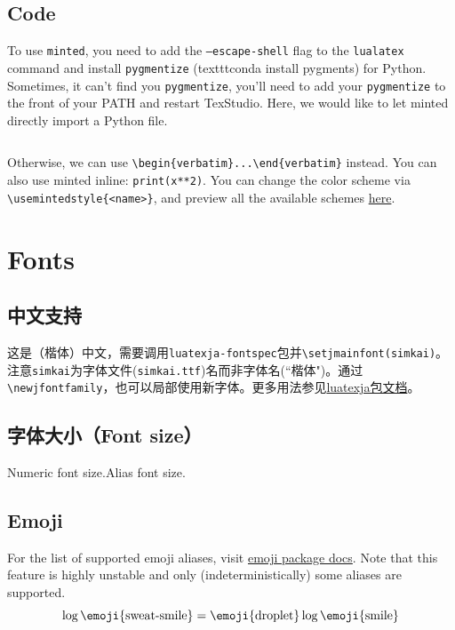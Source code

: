 \documentclass[a4paper]{article}
\begin{document}
\subsection{Code}

To use \texttt{minted}, you need to add the \texttt{--escape-shell} flag to the \texttt{lualatex} command and install \texttt{pygmentize} (texttt{conda install pygments}) for Python. Sometimes, it can't find you \texttt{pygmentize}, you'll need to add your \texttt{pygmentize} to the front of your PATH and restart TexStudio. Here, we would like to let minted directly import a Python file.
\inputminted[linenos]{python}{code/code1.py}
Otherwise, we can use \verb|\begin{verbatim}...\end{verbatim}| instead. You can also use minted inline: \texttt{print(x**2)}. You can change the color scheme via \verb|\usemintedstyle{<name>}|, and preview all the available schemes \href{https://pygments.org/styles/}{here}.

\section{Fonts}

\subsection{中文支持}

这是（楷体）中文，需要调用\verb|luatexja-fontspec|包并\verb|\setjmainfont(simkai)|。注意\verb|simkai|为字体文件(\verb|simkai.ttf|)名而非字体名(``楷体")。{\song 通过\verb|\newjfontfamily|，也可以局部使用新字体。}更多用法参见\href{https://ctan.math.utah.edu/ctan/tex-archive/macros/luatex/generic/luatexja/doc/luatexja-en.pdf}{luatexja包文档}。

\subsection{字体大小（Font size）}
{\fontsize{15pt}{15pt}\selectfont Numeric font size.}{\large Alias font size.}

\subsection{Emoji}
For the list of supported emoji aliases, visit \href{https://ctan.math.utah.edu/ctan/tex-archive/macros/luatex/latex/emoji/emoji-doc.pdf}{emoji package docs}. Note that this feature is highly unstable and only (indeterministically) some aliases are supported.
\begin{equation}
\log \text{\emoji{sweat-smile}} = \text{\emoji{droplet}} \log \text{\emoji{smile}}
\end{equation}
\end{document}
